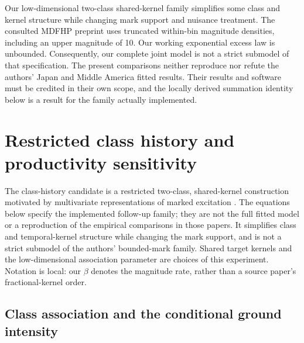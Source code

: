 Our low-dimensional two-class shared-kernel family simplifies some class
and kernel structure while changing mark support and nuisance treatment.
The consulted MDFHP preprint \citep[Section~2]{DavisBaeumerWangPreprint2024}
uses truncated within-bin magnitude densities, including an upper magnitude
of 10. Our working exponential excess law is
unbounded. Consequently, our complete joint model is not a strict submodel
of that specification. The present comparisons neither reproduce nor refute
the authors' Japan and Middle America fitted results. Their results and
software must be credited in their own scope, and the locally derived
summation identity below is a result for the family actually implemented.

\section{Restricted class history and productivity sensitivity}
\label{a2:models}

The class-history candidate is a restricted two-class, shared-kernel
construction motivated by multivariate representations of marked excitation
\citep{DavisBaeumerWang2026,DavisKresinBaeumerWang2026}.
The equations below specify the implemented follow-up family; they are not
the full fitted model or a reproduction of the empirical comparisons in those
papers. It simplifies class and temporal-kernel structure while changing the
mark support, and is not a strict submodel of the authors' bounded-mark
family. Shared target kernels and the low-dimensional association parameter
are choices of this experiment. Notation is local: our \(\beta\) denotes the
magnitude rate, rather than a source paper's fractional-kernel order.

\subsection{Class association and the conditional ground intensity}

